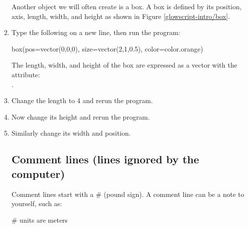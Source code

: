 \begin{enumerate}
Another object we will often create is a box. A box is defined by its position, axis, length, width, and height as shown in Figure \ref{glowscript-intro/box}.


	\item Type the following on a new line, then run the program:

\begin{myvpython}
box(pos=vector(0,0,0), size=vector(2,1,0.5), color=color.orange)
\end{myvpython}

The length, width, and height of the box are expressed as a vector with the attribute:\\
  .  

	\item Change the length to 4 and rerun the program.
	
	\item Now change its height and rerun the program.
	
	\item Similarly change its width and position.


	\subsection*{Comment lines (lines ignored by the computer)}

Comment lines start with a \# (pound sign). 
A comment line can be a note to yourself, such as:

\begin{myvpython}
# units are meters
\end{myvpython}


\end{enumerate}

